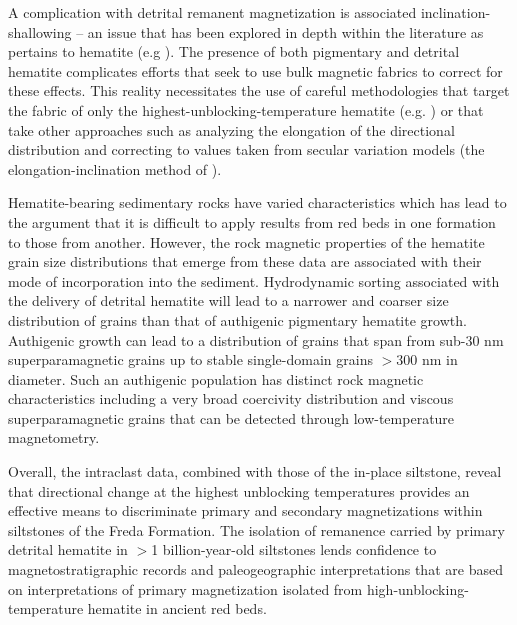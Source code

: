 \documentclass[draft]{agujournal2018}
\begin{document}
A complication with detrital remanent magnetization is associated inclination-shallowing -- an issue that has been explored in depth within the literature as pertains to hematite (e.g \citealp{Tauxe1984a, Iosifidi2010a, Bilardello2010a}). The presence of both pigmentary and detrital hematite complicates efforts that seek to use bulk magnetic fabrics to correct for these effects. This reality necessitates the use of careful methodologies that target the fabric of only the highest-unblocking-temperature hematite (e.g. \citealp{Bilardello2015a}) or that take other approaches such as analyzing the elongation of the directional distribution and correcting to values taken from secular variation models (the elongation-inclination method of \citealp{Tauxe2004a}).

Hematite-bearing sedimentary rocks have varied characteristics which has lead to the argument that it is difficult to apply results from red beds in one formation to those from another. However, the rock magnetic properties of the hematite grain size distributions that emerge from these data are associated with their mode of incorporation into the sediment. Hydrodynamic sorting associated with the delivery of detrital hematite will lead to a narrower and coarser size distribution of grains than that of authigenic pigmentary hematite growth. Authigenic growth can lead to a distribution of grains that span from sub-30 nm superparamagnetic grains up to stable single-domain grains $>$300 nm in diameter. Such an authigenic population has distinct rock magnetic characteristics including a very broad coercivity distribution and viscous superparamagnetic grains that can be detected through low-temperature magnetometry. 
 
Overall, the intraclast data, combined with those of the in-place siltstone, reveal that directional change at the highest unblocking temperatures provides an effective means to discriminate primary and secondary magnetizations within siltstones of the Freda Formation. The isolation of remanence carried by primary detrital hematite in $>$1 billion-year-old siltstones lends confidence to magnetostratigraphic records and paleogeographic interpretations that are based on interpretations of primary magnetization isolated from high-unblocking-temperature hematite in ancient red beds. 



\end{document}

